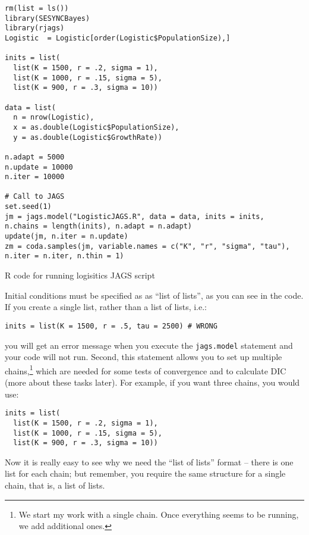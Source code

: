 \documentclass[12pt,english]{article}
\begin{document}
\begin{algorithm}
\begin{Verbatim}[frame=single]
rm(list = ls())
library(SESYNCBayes)
library(rjags)
Logistic  = Logistic[order(Logistic$PopulationSize),]

inits = list(
  list(K = 1500, r = .2, sigma = 1),
  list(K = 1000, r = .15, sigma = 5),
  list(K = 900, r = .3, sigma = 10))

data = list(
  n = nrow(Logistic),
  x = as.double(Logistic$PopulationSize),
  y = as.double(Logistic$GrowthRate))

n.adapt = 5000
n.update = 10000
n.iter = 10000

# Call to JAGS
set.seed(1)
jm = jags.model("LogisticJAGS.R", data = data, inits = inits, 
n.chains = length(inits), n.adapt = n.adapt)
update(jm, n.iter = n.update)
zm = coda.samples(jm, variable.names = c("K", "r", "sigma", "tau"),
n.iter = n.iter, n.thin = 1)
\end{Verbatim}
\caption{R code for running logisitics JAGS script}
\label{alg:R-code-for}
\end{algorithm}

Initial conditions must be specified as as \enquote{list of lists}, as you can see in the code. If you create a single list, rather than a list of lists, i.e.:

\begin{Verbatim}
inits = list(K = 1500, r = .5, tau = 2500) # WRONG
\end{Verbatim}

\noindent you will get an error message when you execute the \texttt{jags.model} statement and your code will not run. Second, this statement allows you to set up multiple chains,\footnote{We start my work with a single chain. Once everything seems to be running, we add additional ones.} which are needed for some tests of convergence and to calculate DIC (more about these tasks later). For example, if you want three chains, you would use:

\begin{Verbatim}
inits = list(
  list(K = 1500, r = .2, sigma = 1),
  list(K = 1000, r = .15, sigma = 5),
  list(K = 900, r = .3, sigma = 10))
\end{Verbatim}

\noindent Now it is really easy to see why we need the \enquote{list of lists} format -- there is one list for each chain; but remember, you require the same structure for a single chain, that is, a list of lists.
\end{document}
